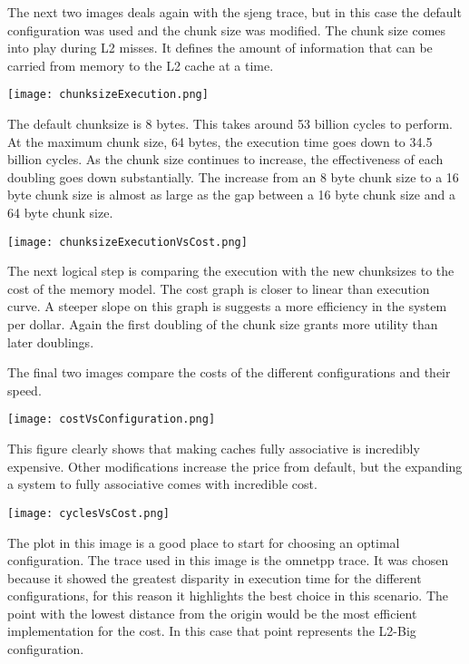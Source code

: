 \documentclass[cacheSimReport.tex]{subfiles}
\begin{document}
\smallskip

The next two images deals again with the sjeng trace, but in this case the default configuration was used and the chunk size was modified. The chunk size comes into play during L2 misses. It defines the amount of information that can be carried from memory to the L2 cache at a time.

\hspace{-.9cm}\texttt{[image: chunksizeExecution.png]}

The default chunksize is 8 bytes. This takes around 53 billion cycles to perform. At the maximum chunk size, 64 bytes, the execution time goes down to 34.5 billion cycles. As the chunk size continues to increase, the effectiveness of each doubling goes down substantially. The increase from an 8 byte chunk size to a 16 byte chunk size is almost as large as the gap between a 16 byte chunk size and a 64 byte chunk size.

\hspace{-.9cm}\texttt{[image: chunksizeExecutionVsCost.png]}

The next logical step is comparing the execution with the new chunksizes to the cost of the memory model. The cost graph is closer to linear than execution curve. A steeper slope on this graph is suggests a more efficiency in the system per dollar. Again the first doubling of the chunk size grants more utility than later doublings.

\smallskip

The final two images compare the costs of the different configurations and their speed. 

\hspace{-.9cm}\texttt{[image: costVsConfiguration.png]}

This figure clearly shows that making caches fully associative is incredibly expensive. Other modifications increase the price from default, but the expanding a system to fully associative comes with incredible cost.

\hspace{.9cm}\texttt{[image: cyclesVsCost.png]}

The plot in this image is a good place to start for choosing an optimal configuration. The trace used in this image is the omnetpp trace. It was chosen because it showed the greatest disparity in execution time for the different configurations, for this reason it highlights the best choice in this scenario. The point with the lowest distance from the origin would be the most efficient implementation for the cost. In this case that point represents the L2-Big configuration.
\end{document}
